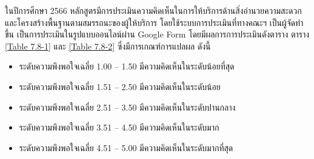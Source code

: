 ในปีการศึกษา 2566 หลักสูตรมีการประเมินความคิดเห็นในการให้บริการด้านสิ่งอำนวยความสะดวกและโครงสร้างพื้นฐานตามสมรรถนะของผู้ให้บริการ โดยใช้ระบบการประเมินที่ทางคณะฯ เป็นผู้จัดทำขึ้น เป็นการประเมินในรูปแบบออนไลน์ผ่าน Google Form โดยมีผลการการประเมินดังตาราง
ตาราง \ref{Table 7.8-1} และ \ref{Table 7.8-2} ซึ่งมีการเกณฑ์การแปลผล ดังนี้
\begin{itemize}
\item ระดับความพึงพอใจเฉลี่ย 1.00 – 1.50 มีความคิดเห็นในระดับน้อยที่สุด
\item ระดับความพึงพอใจเฉลี่ย 1.51 – 2.50 มีความคิดเห็นในระดับน้อย
\item ระดับความพึงพอใจเฉลี่ย 2.51 – 3.50 มีความคิดเห็นในระดับปานกลาง
\item ระดับความพึงพอใจเฉลี่ย 3.51 – 4.50 มีความคิดเห็นในระดับมาก
\item ระดับความพึงพอใจเฉลี่ย 4.51 – 5.00 มีความคิดเห็นในระดับมากที่สุด  
\end{itemize}
